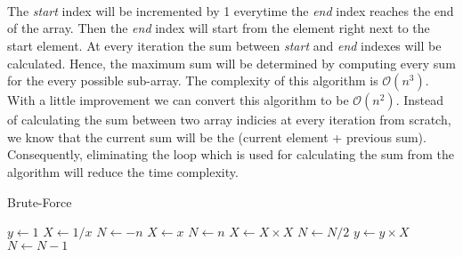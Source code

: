 \documentclass[twocolumns]{IEEEtran}
\begin{document}
\\ \\ \\
The \textit{start} index will be incremented by 1 everytime the \textit{end} index reaches the end of the array. Then the \textit{end} index will start from the element right next to the start element. At every iteration the sum between \textit{start} and \textit{end} indexes will be calculated. Hence, the maximum sum will be determined by computing every sum for the every possible sub-array. The complexity of this algorithm is $\mathcal{O}(n^3)$. With a little improvement we can convert this algorithm to be $\mathcal{O}(n^2)$. Instead of calculating the sum between two array indicies at every iteration from scratch, we know that the current sum will be the (current element + previous sum). Consequently, eliminating the loop which is used for calculating the sum from the algorithm will reduce the time complexity.
\newpage
\begin{algorithm}
	\caption{Brute-Force}
	\begin{algorithmic} 
		\STATE $y \leftarrow 1$ 
		\STATE $X \leftarrow 1 / x$
		\STATE $N \leftarrow -n$
		\ELSE
		\STATE $X \leftarrow x$
		\STATE $N \leftarrow n$
		\ENDIF
		\STATE $X \leftarrow X \times X$
		\STATE $N \leftarrow N / 2$
		\ELSE[$N$ is odd]
		\STATE $y \leftarrow y \times X$
		\STATE $N \leftarrow N - 1$
		\ENDIF
		\ENDWHILE
	\end{algorithmic}
\end{algorithm}
\end{document}
